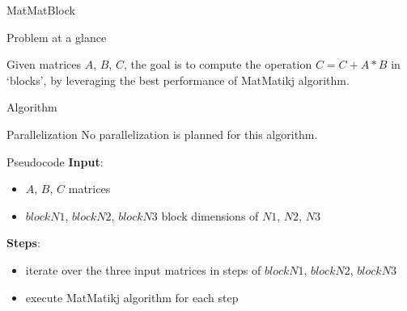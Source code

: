 \begin{chapter}{MatMatBlock}
    \begin{section}{Problem at a glance}
        \par Given matrices $A$, $B$, $C$, the goal is to compute the  operation $C = C + A * B$ in `blocks', by leveraging the best performance of MatMatikj algorithm.
    \end{section}
    \begin{section}{Algorithm}
        \begin{subsection}{Parallelization}
            No parallelization is planned for this algorithm.
        \end{subsection}
        \begin{subsection}{Pseudocode}
            \textbf{Input}:
            \begin{itemize}
                \item $A$, $B$, $C$ matrices
                \item $blockN1$, $blockN2$, $blockN3$ block dimensions of $N1$, $N2$, $N3$
            \end{itemize}
            \textbf{Steps}:
            \begin{itemize}
                \item iterate over the three input matrices in steps of $blockN1$, $blockN2$, $blockN3$
                \item execute MatMatikj algorithm for each step
            \end{itemize}
            
        \end{subsection}
    \end{section}
\end{chapter}